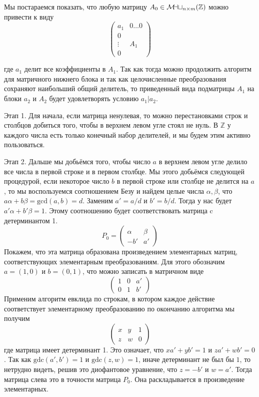 \documentclass{article}
\newcommand{\mymat}{\mathcal{M\mkern-3mu a\mkern-0.3mu t}}
\begin{document}
\begin{enumerate}
        Мы постараемся показать, что любую матрицу $A_0\in\mymat_{n\times m}(\mathbb{Z})$ можно привести к виду
        \[\left(\begin{array}{cc}
        a_1 & 0\ldots 0\\
        0 & \\
        \vdots & A_1\\
        0 & \end{array}\right)\]

        где $a_1$ делит все коэффициенты в $A_1$. Так как тогда можно продолжить
        алгоритм для матричного нижнего блока и так как целочисленные преобразования сохраняют наибольший общий делитель,
        то приведенный вида подматрицы $A_1$ на блоки $a_2$ и $A_2$ будет удовлетворять условию $a_1\vert a_2$.

        Этап 1. Для начала, если матрица ненулевая, то можно перестановками строк и столбцов добиться того, чтобы в верхнем левом угле
        стоял не нуль. В $\mathbb{Z}$ у каждого числа есть только конечный набор делителей, и мы будем этим активно пользоваться.

        Этап 2. Дальше мы добьёмся того, чтобы число $a$ в верхнем левом угле делило все числа в первой строке и в первом столбце. Мы этого
        добьёмся следующей процедурой, если некоторое число $b$ в первой строке или столбце не делится на $a$, то мы воспользуемся
        соотношением Безу и найдем целые числа $\alpha,\beta$, что $a\alpha+b\beta=\text{gcd}(a,b)=d$. Заменим $a'=a/d$ и $b'=b/d$.
        Тогда у нас будет $a'\alpha+b'\beta=1$. Этому соотношению будет соответствовать матрица c детерминантом 1.
        \[ P_0 = \left(\begin{array}{cc}\alpha & \beta\\-b' & a'\end{array}\right)\]
        Покажем, что эта матрица образована произведением элементарных матриц, соответствующих элементарным преобразованиям.
        Для этого обозначим $a=(1,0)$ и $b=(0,1)$, что можно записать в матричном виде
        \[\left(\begin{array}{cc|c}1 & 0 & a'\\0 & 1 & b'\end{array}\right)\]
        Применим алгоритм евклида по строкам, в котором каждое действие соответствует элементарному преобразованию по окончанию
        алгоритма мы получим
        \[\left(\begin{array}{cc|c}x & y & 1\\ z & w & 0\end{array}\right)\]
        где матрица имеет детерминант 1. Это означает, что $xa'+yb'=1$ и
        $za'+wb'=0$. Так как $\text{gdc}(a',b')=1$ и $\text{gdc}(z,w)=1$,
        иначе детерминант не был бы $1$, то нетрудно видеть, решив это диофантовое уравнение, что $z=-b'$ и $w=a'$. Тогда
        матрица слева это в точности матрица $P_0$. Она раскладывается в произведение элементарных.


\end{enumerate}
\end{document}
